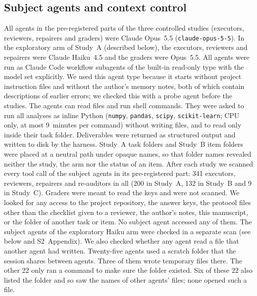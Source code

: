 \subsection*{Subject agents and context control}
All agents in the pre-registered parts of the three controlled studies
(executors, reviewers, repairers and graders) were Claude Opus~5.5
(\texttt{claude-opus-5-5}). In the exploratory arm of Study~A (described
below), the executors, reviewers and repairers were Claude Haiku~4.5 and
the graders were Opus~5.5. All agents were run as Claude Code workflow
subagents of the built-in read-only type with the model set explicitly.
We used this agent type because it starts
without project instruction files and without the author's memory notes,
both of which contain descriptions of earlier errors; we checked this with
a probe agent before the studies. The agents can read files and run
shell commands. They were asked to run all analyses as inline Python
(\texttt{numpy}, \texttt{pandas}, \texttt{scipy}, \texttt{scikit-learn};
CPU only, at most 9~minutes per command) without writing files, and to
read only inside their task folder. Deliverables were returned as
structured output and written to disk by the harness. Study~A task folders and Study~B item folders were placed
at a neutral path under opaque names, so that folder names revealed
neither the study, the arm nor the status of an item. After each study we
scanned every tool call of the subject agents in its pre-registered part:
341 executors, reviewers, repairers and re-auditors in all (200 in
Study~A, 132 in Study~B and 9 in Study~C). Graders were meant to read the
keys and were not scanned. We looked for any access to the project
repository, the answer keys, the protocol files other than the checklist
given to a reviewer, the author's notes, this manuscript, or the folder
of another task or item. No subject agent accessed any of them. The
subject agents of the exploratory Haiku arm were checked in a separate
scan (see below and S2~Appendix). We also checked whether any agent
read a file that another agent had written. Twenty-five agents used a
scratch folder that the session shares between agents. Three of them
wrote temporary files there. The other 22 only ran a command to make sure
the folder existed. Six of these 22 also listed the folder and so saw the
names of other agents' files; none opened such a file.

